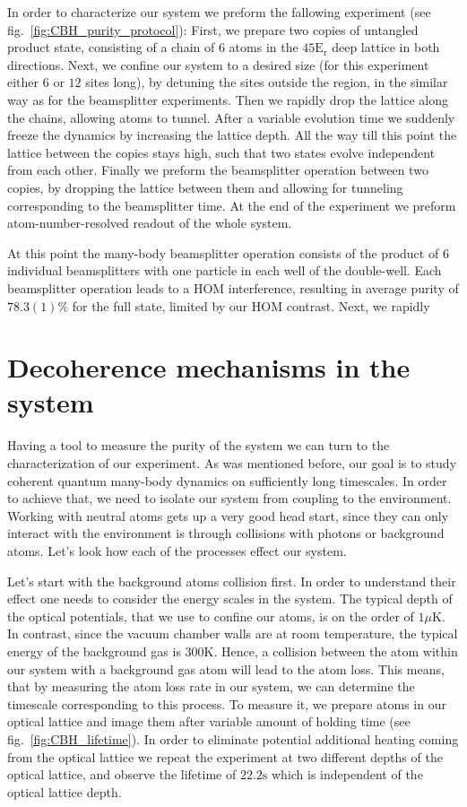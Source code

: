 In order to characterize our system we preform the fallowing experiment (see fig.~\ref{fig:CBH_purity_protocol}): First, we prepare two copies of untangled product state, consisting of a chain of $6$ atoms in the $45\mathrm{E_r}$ deep lattice in both directions. Next, we confine our system to a desired size (for this experiment either $6$ or $12$ sites long), by detuning the sites outside the region, in the similar way as for the beamsplitter experiments. Then we rapidly drop the lattice along the chains, allowing atoms to tunnel. After a variable evolution time we suddenly freeze the dynamics by increasing the lattice depth. All the way till this point the lattice between the copies stays high, such that two states evolve independent from each other. Finally we preform the beamsplitter operation between two copies, by dropping the lattice between them and allowing for tunneling corresponding to the beamsplitter time. At the end of the experiment we preform atom-number-resolved readout of the whole system.

At this point the many-body beamsplitter operation consists of the product of $6$ individual beamsplitters with one particle in each well of the double-well. Each beamsplitter operation leads to a HOM interference, resulting in average purity of $78.3(1)\%$ for the full state, limited by our HOM contrast. Next, we rapidly 

\section{Decoherence mechanisms in the system}
Having a tool to measure the purity of the system we can turn to the characterization of our experiment. As was mentioned before, our goal is to study coherent quantum many-body dynamics on sufficiently long timescales. In order to achieve that, we need to isolate our system from coupling to the environment. Working with neutral atoms gets up a very good head start, since they can only interact with the environment is through collisions with photons or background atoms. Let's look how each of the processes effect our system.

Let's start with the background atoms collision first. In order to understand their effect one needs to consider the energy scales in the system. The typical depth of the optical potentials, that we use to confine our atoms, is on the order of $1 \mu \textrm{K}$. In contrast, since the vacuum chamber walls are at room temperature, the typical energy of the background gas is $300 \textrm{K}$. Hence, a collision between the atom within our system with a background gas atom will lead to the atom loss. This means, that by measuring the atom loss rate in our system, we can determine the timescale corresponding to this process. To measure it, we prepare atoms in our optical lattice and image them after variable amount of holding time (see fig.~\ref{fig:CBH_lifetime}). In order to eliminate potential additional heating coming from the optical lattice we repeat the experiment at two different depths of the optical lattice, and observe the lifetime of $22.2\textrm{s}$ which is independent of the optical lattice depth.

